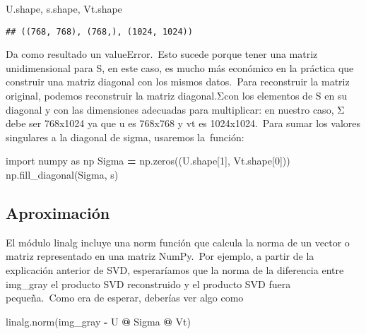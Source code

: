 \documentclass[
]{article}
\newenvironment{Shaded}{\begin{snugshade}}{\end{snugshade}}
\newcommand{\DecValTok}[1]{\textcolor[rgb]{0.00,0.00,0.81}{#1}}
\newcommand{\ImportTok}[1]{#1}
\newcommand{\NormalTok}[1]{#1}
\newcommand{\OperatorTok}[1]{\textcolor[rgb]{0.81,0.36,0.00}{\textbf{#1}}}
\begin{document}
\begin{Shaded}
\begin{Highlighting}[]
\NormalTok{U.shape, s.shape, Vt.shape}
\end{Highlighting}
\end{Shaded}

\begin{verbatim}
## ((768, 768), (768,), (1024, 1024))
\end{verbatim}

Da como resultado un valueError.~Esto sucede porque tener una matriz
unidimensional para S, en este caso, es mucho más económico en la
práctica que construir una matriz diagonal con los mismos datos.~Para
reconstruir la matriz original, podemos reconstruir la matriz
diagonal.Σcon los elementos de S en su diagonal y con las dimensiones
adecuadas para multiplicar: en nuestro caso, Σ debe ser 768x1024 ya que
u es 768x768 y vt es 1024x1024.~Para sumar los valores singulares a la
diagonal de sigma, usaremos la~función:

\begin{Shaded}
\begin{Highlighting}[]
\ImportTok{import}\NormalTok{ numpy }\ImportTok{as}\NormalTok{ np}
\NormalTok{Sigma }\OperatorTok{=}\NormalTok{ np.zeros((U.shape[}\DecValTok{1}\NormalTok{], Vt.shape[}\DecValTok{0}\NormalTok{]))}
\NormalTok{np.fill\_diagonal(Sigma, s)}
\end{Highlighting}
\end{Shaded}

\hypertarget{aproximaciuxf3n}{%
\subsection{\texorpdfstring{\textbf{Aproximación}}{Aproximación}}\label{aproximaciuxf3n}}

El módulo linalg incluye una norm función que calcula la norma de un
vector o matriz representado en una matriz NumPy.~Por ejemplo, a partir
de la explicación anterior de SVD, esperaríamos que la norma de la
diferencia entre img\_gray el producto SVD reconstruido y el producto
SVD fuera pequeña.~Como era de esperar, deberías ver algo como

\begin{Shaded}
\begin{Highlighting}[]
\NormalTok{linalg.norm(img\_gray }\OperatorTok{{-}}\NormalTok{ U }\OperatorTok{@}\NormalTok{ Sigma }\OperatorTok{@}\NormalTok{ Vt)}
\end{Highlighting}
\end{Shaded}
\end{document}
